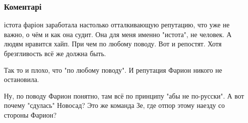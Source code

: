  
 
 
 
 
\subsubsection{Коментарі}

\begin{itemize}
 

істота фаріон заработала настолько отталкивающую репутацию, что уже не важно, о
чём и как она судит. Она для меня именно "истота", не человек. А людям нравится
хайп. При чем по любому поводу. Вот и репостят. Хотя брезгливость всё же должна
быть.

\begin{itemize}
 
Так то и плохо, что "по любому поводу". И репутация Фарион никого не остановила.
\end{itemize}

 

Ну, по поводу Фарион понятно, там всё по принципу "абы не по-русски". А вот
почему "сдулась" Новосад? Это же команда Зе, где отпор этому наезду
со стороны Фарион?

\begin{itemize}
 

\end{itemize}
\end{itemize}

